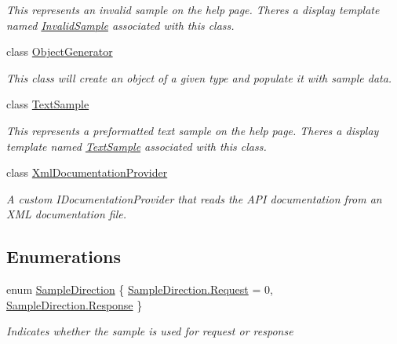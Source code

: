 \begin{DoxyCompactItemize}
\begin{DoxyCompactList}\small\item\em This represents an invalid sample on the help page. There\textquotesingle{}s a display template named \hyperlink{class_open_1_1_g_i_1_1hypermart_1_1_areas_1_1_help_page_1_1_invalid_sample}{Invalid\+Sample} associated with this class. \end{DoxyCompactList}\item 
class \hyperlink{class_open_1_1_g_i_1_1hypermart_1_1_areas_1_1_help_page_1_1_object_generator}{Object\+Generator}
\begin{DoxyCompactList}\small\item\em This class will create an object of a given type and populate it with sample data. \end{DoxyCompactList}\item 
class \hyperlink{class_open_1_1_g_i_1_1hypermart_1_1_areas_1_1_help_page_1_1_text_sample}{Text\+Sample}
\begin{DoxyCompactList}\small\item\em This represents a preformatted text sample on the help page. There\textquotesingle{}s a display template named \hyperlink{class_open_1_1_g_i_1_1hypermart_1_1_areas_1_1_help_page_1_1_text_sample}{Text\+Sample} associated with this class. \end{DoxyCompactList}\item 
class \hyperlink{class_open_1_1_g_i_1_1hypermart_1_1_areas_1_1_help_page_1_1_xml_documentation_provider}{Xml\+Documentation\+Provider}
\begin{DoxyCompactList}\small\item\em A custom I\+Documentation\+Provider that reads the A\+PI documentation from an X\+ML documentation file. \end{DoxyCompactList}\end{DoxyCompactItemize}
\subsection*{Enumerations}
\begin{DoxyCompactItemize}
\item 
enum \hyperlink{namespace_open_1_1_g_i_1_1hypermart_1_1_areas_1_1_help_page_a96790152101b7f9c7e4ff518bb45c822}{Sample\+Direction} \{ \hyperlink{namespace_open_1_1_g_i_1_1hypermart_1_1_areas_1_1_help_page_a96790152101b7f9c7e4ff518bb45c822a15c2d85f1fae22a3c3a0594510a1f611}{Sample\+Direction.\+Request} = 0, 
\hyperlink{namespace_open_1_1_g_i_1_1hypermart_1_1_areas_1_1_help_page_a96790152101b7f9c7e4ff518bb45c822ad64ed3e9c10229648e069f56e32f4c8e}{Sample\+Direction.\+Response}
 \}\begin{DoxyCompactList}\small\item\em Indicates whether the sample is used for request or response \end{DoxyCompactList}
\end{DoxyCompactItemize}



